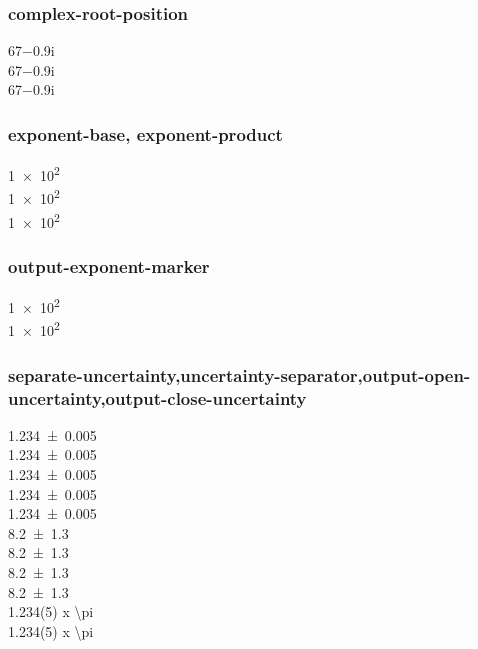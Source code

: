 \documentclass{article}
\begin{document}
\subsubsection{complex-root-position}
\num{67-0.9i} \\
\num[complex-root-position = before-number]{67-0.9i} \\
\num[complex-root-position = after-number]{67-0.9i}\\

\subsubsection{exponent-base, exponent-product}
\num[exponent-product = \times]{1e2} \\
\num[exponent-product = \cdot]{1e2} \\
\num[exponent-base = 2]{1e2}\\

\subsubsection{output-exponent-marker}
\num[output-exponent-marker = \text{e}]{1e2} \\
\num[output-exponent-marker = \ensuremath{\mathrm{E}}]{1e2}\\

\subsubsection{separate-uncertainty,uncertainty-separator,output-open-uncertainty,output-close-uncertainty}
{
\num{1.234(5)} \\
\num{1.234\pm 0.005} \\
\num[separate-uncertainty = true]{1.234(5)} \\
\num[separate-uncertainty = true]{1.234\pm 0.005} \\
\num{1.234(5)}\\
}
\num{8.2(13)} \\
\num{8.2\pm1.3} \\
\num[separate-uncertainty]{8.2(13)}\\
\num[separate-uncertainty]{8.2\pm1.3} \\

\num{1.234(5) x \pi} \\
\num[separate-uncertainty = true]{1.234(5) x \pi} \\
\end{document}
